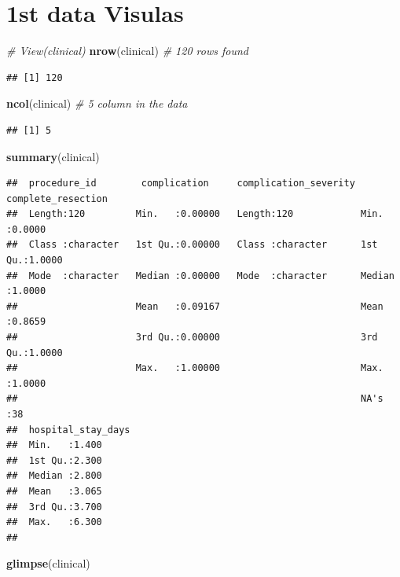 \documentclass[
]{article}
\newenvironment{Shaded}{\begin{snugshade}}{\end{snugshade}}
\newcommand{\CommentTok}[1]{\textcolor[rgb]{0.56,0.35,0.01}{\textit{#1}}}
\newcommand{\FunctionTok}[1]{\textcolor[rgb]{0.13,0.29,0.53}{\textbf{#1}}}
\newcommand{\NormalTok}[1]{#1}
\begin{document}
\section{1st data Visulas}\label{st-data-visulas}

\begin{Shaded}
\begin{Highlighting}[]
\CommentTok{\# View(clinical)}
\FunctionTok{nrow}\NormalTok{(clinical) }\CommentTok{\# 120 rows found}
\end{Highlighting}
\end{Shaded}

\begin{verbatim}
## [1] 120
\end{verbatim}

\begin{Shaded}
\begin{Highlighting}[]
\FunctionTok{ncol}\NormalTok{(clinical) }\CommentTok{\# 5 column in the data }
\end{Highlighting}
\end{Shaded}

\begin{verbatim}
## [1] 5
\end{verbatim}

\begin{Shaded}
\begin{Highlighting}[]
\FunctionTok{summary}\NormalTok{(clinical)}
\end{Highlighting}
\end{Shaded}

\begin{verbatim}
##  procedure_id        complication     complication_severity complete_resection
##  Length:120         Min.   :0.00000   Length:120            Min.   :0.0000    
##  Class :character   1st Qu.:0.00000   Class :character      1st Qu.:1.0000    
##  Mode  :character   Median :0.00000   Mode  :character      Median :1.0000    
##                     Mean   :0.09167                         Mean   :0.8659    
##                     3rd Qu.:0.00000                         3rd Qu.:1.0000    
##                     Max.   :1.00000                         Max.   :1.0000    
##                                                             NA's   :38        
##  hospital_stay_days
##  Min.   :1.400     
##  1st Qu.:2.300     
##  Median :2.800     
##  Mean   :3.065     
##  3rd Qu.:3.700     
##  Max.   :6.300     
## 
\end{verbatim}

\begin{Shaded}
\begin{Highlighting}[]
\FunctionTok{glimpse}\NormalTok{(clinical)}
\end{Highlighting}
\end{Shaded}
\end{document}

